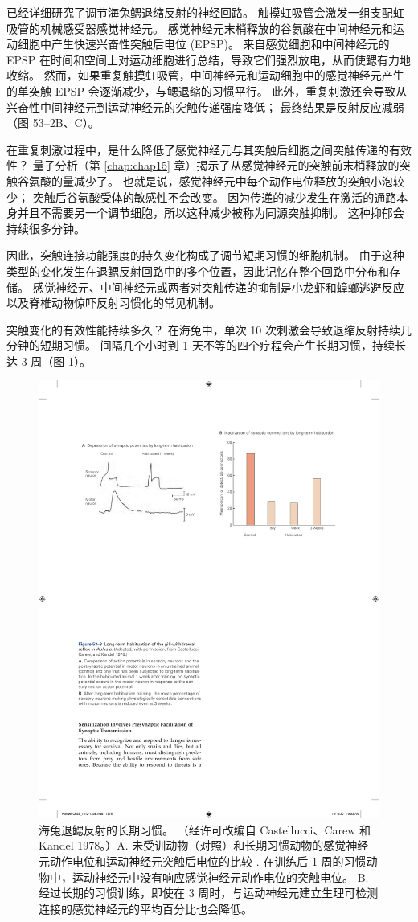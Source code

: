 已经详细研究了调节海兔鳃退缩反射的神经回路。
触摸虹吸管会激发一组支配虹吸管的机械感受器感觉神经元。
感觉神经元末梢释放的谷氨酸在中间神经元和运动细胞中产生快速兴奋性突触后电位 (EPSP)。
来自感觉细胞和中间神经元的 EPSP 在时间和空间上对运动细胞进行总结，导致它们强烈放电，从而使鳃有力地收缩。
然而，如果重复触摸虹吸管，中间神经元和运动细胞中的感觉神经元产生的单突触 EPSP 会逐渐减少，与鳃退缩的习惯平行。
此外，重复刺激还会导致从兴奋性中间神经元到运动神经元的突触传递强度降低；
最终结果是反射反应减弱（图 53–2B、C）。


在重复刺激过程中，是什么降低了感觉神经元与其突触后细胞之间突触传递的有效性？
量子分析（第 \ref{chap:chap15} 章）揭示了从感觉神经元的突触前末梢释放的突触谷氨酸的量减少了。
也就是说，感觉神经元中每个动作电位释放的突触小泡较少；
突触后谷氨酸受体的敏感性不会改变。
因为传递的减少发生在激活的通路本身并且不需要另一个调节细胞，所以这种减少被称为同源突触抑制。
这种抑郁会持续很多分钟。


因此，突触连接功能强度的持久变化构成了调节短期习惯的细胞机制。
由于这种类型的变化发生在退鳃反射回路中的多个位置，因此记忆在整个回路中分布和存储。
感觉神经元、中间神经元或两者对突触传递的抑制是小龙虾和蟑螂逃避反应以及脊椎动物惊吓反射习惯化的常见机制。


突触变化的有效性能持续多久？
在海兔中，单次 10 次刺激会导致退缩反射持续几分钟的短期习惯。
间隔几个小时到 1 天不等的四个疗程会产生长期习惯，持续长达 3 周（图 \ref{fig:53_3}）。


\begin{figure}[htbp]
	\centering
	\includegraphics[width=0.45\linewidth]{chap53/fig_53_3}
	\caption{海兔退鳃反射的长期习惯。 （经许可改编自 Castellucci、Carew 和 Kandel 1978。）A. 未受训动物（对照）和长期习惯动物的感觉神经元动作电位和运动神经元突触后电位的比较 . 在训练后 1 周的习惯动物中，运动神经元中没有响应感觉神经元动作电位的突触电位。 B. 经过长期的习惯训练，即使在 3 周时，与运动神经元建立生理可检测连接的感觉神经元的平均百分比也会降低。}
	\label{fig:53_3}
\end{figure}


